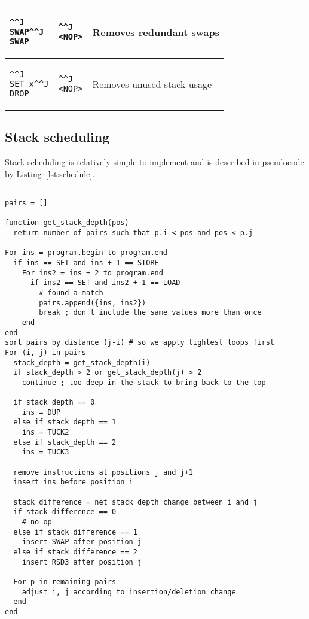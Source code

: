 \begin{table}
\begin{tabularx}{\linewidth}{l l X}
\begin{lstlisting}^^J
SWAP^^J
SWAP
\end{lstlisting} &
\begin{lstlisting}^^J
<NOP>
\end{lstlisting} &
Removes redundant swaps \\ \midrule
\begin{lstlisting}^^J
SET x^^J
DROP
\end{lstlisting} &
\begin{lstlisting}^^J
<NOP>
\end{lstlisting} &
Removes unused stack usage \\ \bottomrule
\end{tabularx}
\end{table}

\subsection{Stack scheduling}
Stack scheduling is relatively simple to implement and is described in
pseudocode by Listing~\ref{lst:schedule}.

\begin{lstlisting}[caption={Stack scheduling
implementation},float,label=lst:schedule]

pairs = []

function get_stack_depth(pos)
  return number of pairs such that p.i < pos and pos < p.j

For ins = program.begin to program.end
  if ins == SET and ins + 1 == STORE
    For ins2 = ins + 2 to program.end
      if ins2 == SET and ins2 + 1 == LOAD
        # found a match
        pairs.append({ins, ins2})
        break ; don't include the same values more than once
    end
end
sort pairs by distance (j-i) # so we apply tightest loops first
For (i, j) in pairs
  stack_depth = get_stack_depth(i)
  if stack_depth > 2 or get_stack_depth(j) > 2
    continue ; too deep in the stack to bring back to the top

  if stack_depth == 0
    ins = DUP
  else if stack_depth == 1
    ins = TUCK2
  else if stack_depth == 2
    ins = TUCK3

  remove instructions at positions j and j+1
  insert ins before position i

  stack difference = net stack depth change between i and j
  if stack difference == 0
    # no op
  else if stack difference == 1
    insert SWAP after position j
  else if stack difference == 2
    insert RSD3 after position j

  For p in remaining pairs
    adjust i, j according to insertion/deletion change
  end
end
\end{lstlisting}


